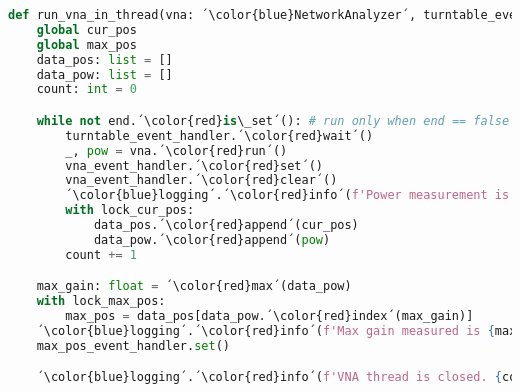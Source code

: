 \begin{lstlisting}[language=Python, caption=Thread function for running VNA.]
def run_vna_in_thread(vna: ´\color{blue}NetworkAnalyzer´, turntable_event_handler: ´\color{blue}Event´, vna_event_handler: ´\color{blue}Event´, end: ´\color{blue}Event´) -> None:
    global cur_pos 
    global max_pos
    data_pos: list = []
    data_pow: list = []
    count: int = 0 

    while not end.´\color{red}is\_set´(): # run only when end == false
        turntable_event_handler.´\color{red}wait´() 
        _, pow = vna.´\color{red}run´()
        vna_event_handler.´\color{red}set´() 
        vna_event_handler.´\color{red}clear´()
        ´\color{blue}logging´.´\color{red}info´(f'Power measurement is {pow}.')
        with lock_cur_pos: 
            data_pos.´\color{red}append´(cur_pos)
            data_pow.´\color{red}append´(pow)
        count += 1

    max_gain: float = ´\color{red}max´(data_pow)
    with lock_max_pos:
        max_pos = data_pos[data_pow.´\color{red}index´(max_gain)]
    ´\color{blue}logging´.´\color{red}info´(f'Max gain measured is {max_gain} at position {max_pos}.')
    max_pos_event_handler.set() 

    ´\color{blue}logging´.´\color{red}info´(f'VNA thread is closed. {count} measurements made.')
\end{lstlisting}

